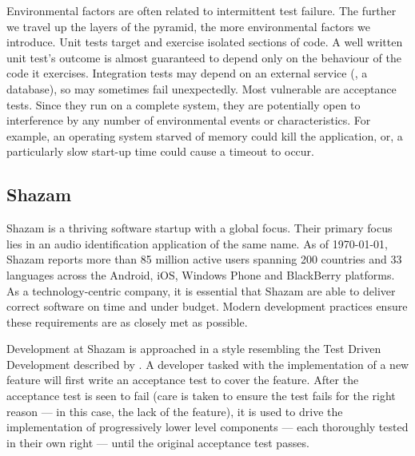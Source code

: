Environmental factors are often related to intermittent test failure. The further we travel up the layers of the pyramid, the more environmental factors we introduce. Unit tests target and exercise isolated sections of code. A well written unit test's outcome is almost guaranteed to depend only on the behaviour of the code it exercises. Integration tests may depend on an external service (\eg, a database), so may sometimes fail unexpectedly. Most vulnerable are acceptance tests. Since they run on a complete system, they are potentially open to interference by any number of environmental events or characteristics. For example, an operating system starved of memory could kill the application, or, a particularly slow start-up time could cause a timeout to occur.


\subsection{Shazam}

Shazam is a thriving software startup with a global focus. Their primary focus lies in an audio identification application of the same name. As of \today, Shazam reports more than 85 million active users spanning 200 countries and 33 languages across the Android, iOS, Windows Phone and BlackBerry platforms. As a technology-centric company, it is essential that Shazam are able to deliver correct software on time and under budget. Modern development practices ensure these requirements are as closely met as possible.

Development at Shazam is approached in a style resembling the Test Driven Development described by \citet*{freeman2009growing}. A developer tasked with the implementation of a new feature will first write an acceptance test to cover the feature. After the acceptance test is seen to fail (care is taken to ensure the test fails for the right reason --- in this case, the lack of the feature), it is used to drive the implementation of progressively lower level components --- each thoroughly tested in their own right --- until the original acceptance test passes.

